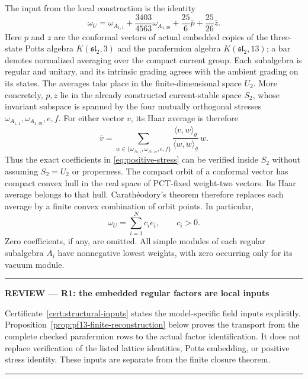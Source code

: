 \documentclass[11pt,a4paper]{article}
\theoremstyle{definition}
\newenvironment{reviewnote}[1]{\par\addvspace{8pt}\begingroup
  \color{Sepia}\noindent\rule{\linewidth}{0.7pt}\par\nobreak
  \noindent\textbf{REVIEW --- #1}\par\nobreak\small\noindent\ignorespaces
}{\par\noindent\rule{\linewidth}{0.7pt}\par\endgroup\addvspace{8pt}}
\begin{document}
The input from the local construction is the identity
\begin{equation}
 \omega_U=\omega_{A_{1,1}}
   +\frac{3403}{4563}\omega_{A_{1,39}}
   +\frac{25}{6}\overline p+\frac{25}{26}\overline z.
 \label{eq:positive-stress}
\end{equation}
Here $p$ and $z$ are the conformal vectors of actual embedded copies of
the three-state Potts algebra $K(\mathfrak{sl}_2,3)$ and the parafermion
algebra $K(\mathfrak{sl}_2,13)$; a bar denotes normalized averaging over
the compact current group. Each subalgebra is regular and unitary, and
its intrinsic grading agrees with the ambient grading on its states.
The averages take place in the finite-dimensional space $U_2$.
More concretely, $p,z$ lie in the already constructed current-stable
space $S_2$, whose invariant subspace is spanned by the four mutually
orthogonal stresses $\omega_{A_{1,1}},\omega_{A_{1,39}},e,f$.
For either vector $v$, its Haar average is therefore
\[
 \overline v=\sum_{w\in\{\omega_{A_{1,1}},\omega_{A_{1,39}},e,f\}}
       \frac{\langle v,w\rangle_g}{\langle w,w\rangle_g}\,w.
\]
Thus the exact coefficients in \eqref{eq:positive-stress} can be
verified inside $S_2$ without assuming $S_2=U_2$ or properness.
The compact orbit of a conformal vector has compact convex hull in the
real space of PCT-fixed weight-two vectors. Its Haar average belongs
to that hull. Carath\'eodory's theorem therefore replaces each average
by a finite convex combination of orbit points. In particular,
\begin{equation}
 \omega_U=\sum_{i=1}^N c_i e_i,\qquad c_i>0.
 \label{eq:finite-positive-stress}
\end{equation}
Zero coefficients, if any, are omitted. All simple modules of each
regular subalgebra $A_i$ have nonnegative lowest weights, with zero
occurring only for its vacuum module.

\begin{reviewnote}{R1: the embedded regular factors are local inputs}
Certificate~\ref{cert:structural-inputs} states the model-specific
field inputs explicitly. Proposition~\ref{prop:pf13-finite-reconstruction}
below proves the transport from the complete checked parafermion rows
to the actual factor identification. It does not replace verification
of the listed lattice identities, Potts embedding, or positive stress
identity. These inputs are separate from the finite closure theorem.
\end{reviewnote}
\end{document}

